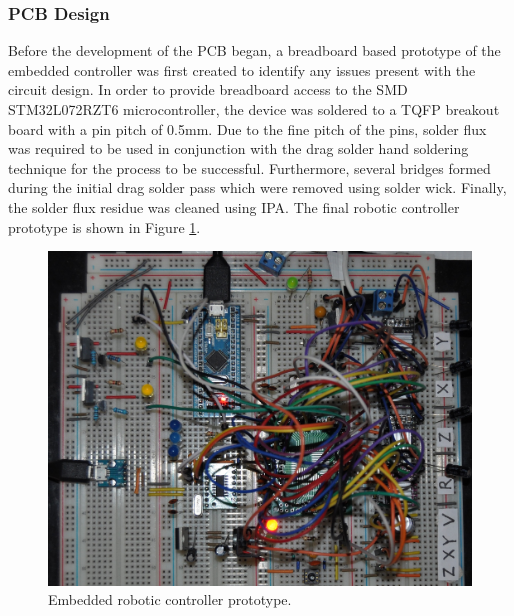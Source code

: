


\subsubsection{PCB Design} \label{sec:PCB Design}

Before the development of the PCB began, a breadboard based prototype of the embedded controller was first created to identify any issues present with the circuit design. In order to provide breadboard access to the SMD STM32L072RZT6 microcontroller, the device was soldered to a TQFP breakout board with a pin pitch of 0.5mm. Due to the fine pitch of the pins, solder flux was required to be used in conjunction with the drag solder hand soldering technique for the process to be successful. Furthermore, several bridges formed during the initial drag solder pass which were removed using solder wick. Finally, the solder flux residue was cleaned using IPA. The final robotic controller prototype is shown in Figure \ref{fig:robotic-controller-prototype}.

\begin{figure}[H]
	\centering
	\includegraphics[width=0.6\linewidth]{figures/robotic-controller-prototype.JPG}
	\caption{Embedded robotic controller prototype.}
	\label{fig:robotic-controller-prototype}
\end{figure}

